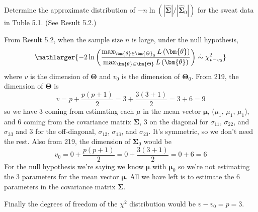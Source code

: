 Determine the approximate distribution of $-n \ln\left( |\hat{\bm{\Sigma}}|/ |\hat{\bm{\Sigma}}_{0}| \right)$ for the sweat data in
Tuble 5.1. (See Result 5.2.)
\newline
\par
From Result 5.2, when the sample size $n$ is large, under the null hypothesis,
\[
\mathlarger{
    -2 \ln \left(
        \frac{\max_{\bm{\theta} \in \bm{\Theta}_{0}} L\left(\bm{\theta}\right)}{\max_{\bm{\theta} \in \bm{\Theta}} L\left(\bm{\theta}\right)}
    \right)
    \overset{\cdot}{\sim}
    \chi_{v- v_{0}}^{2}
}
\]
where $v$ is the dimension of $\bm{\Theta}$ and $v_{0}$ is the dimension of $\bm{\Theta}_{0}$.
From 219, the dimension of $\bm{\Theta}$ is
\[
    v
    =
    p +\frac{p(p+1)}{2}
    =
    3 + \frac{3(3+1)}{2}
    =
    3 + 6
    =
    9
\]
so we have 3 coming from estimating each $\mu$ in the mean vector $\bm{\mu}$, ($\mu_{1}$, $\mu_{1}$, $\mu_{1}$), and 6 coming from the covariance matrix $\bm{\Sigma}$, 3 on the diagonal for $\sigma_{11}$, $\sigma_{22}$, and $\sigma_{33}$ and 3 for the off-diagonal, $\sigma_{12}$, $\sigma_{13}$, and $\sigma_{23}$. It's symmetric, so we don't need the rest. Also from 219, the dimension of $\bm{\Sigma}_{0}$ would be
\[
    v_{0}
    =
    0 +\frac{p(p+1)}{2}
    =
    0 + \frac{3(3+1)}{2}
    =
    0 + 6
    =
    6
\]
For the null hypothesis we're saying we know $\bm{\mu}$ with $\bm{\mu}_{0}$ so we're not estimating the 3 parameters for the mean vector $\bm{\mu}$. All we have left is to estimate the 6 parameters in the covariance matrix $\bm{\Sigma}$.

Finally the degrees of freedom of the $\chi^2$ distribution would be $v - v_{0} = p = 3$.